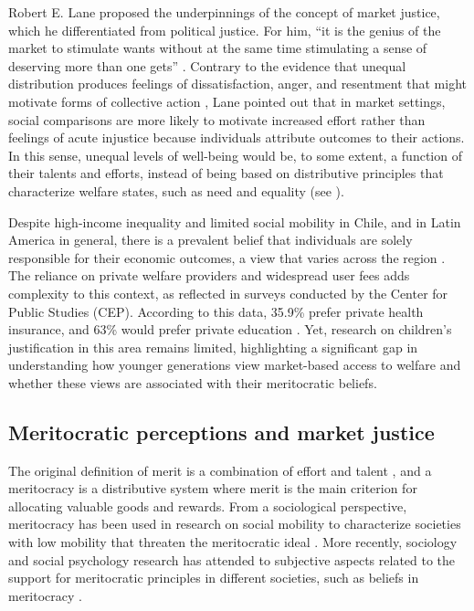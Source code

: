 \documentclass[
    behavsci,
    article,
    submit,
moreauthors
]{mdpi}
\begin{document}
Robert E. Lane proposed the underpinnings of the concept of market
justice, which he differentiated from political justice. For him, ``it
is the genius of the market to stimulate wants without at the same time
stimulating a sense of deserving more than one gets''
\citeyearpar[p.~384]{lane_market_1986}. Contrary to the evidence that
unequal distribution produces feelings of dissatisfaction, anger, and
resentment that might motivate forms of collective action
\citep{greitemeyer_subjective_2016, mishra_subjective_2015, smith_relative_2012, power_deprivationprotest_2018},
Lane pointed out that in market settings, social comparisons are more
likely to motivate increased effort rather than feelings of acute
injustice because individuals attribute outcomes to their actions. In
this sense, unequal levels of well-being would be, to some extent, a
function of their talents and efforts, instead of being based on
distributive principles that characterize welfare states, such as need
and equality (see \citep{wilson_role_2003}).

Despite high-income inequality and limited social mobility in Chile, and
in Latin America in general, there is a prevalent belief that
individuals are solely responsible for their economic outcomes, a view
that varies across the region
\citep{bucca_merit_2016, chong_mystery_2008, torche_intergenerational_2014, salgado_inequality_2023}.
The reliance on private welfare providers and widespread user fees
\citep{molyneux_neoliberal_2008} adds complexity to this context, as
reflected in surveys conducted by the Center for Public Studies (CEP).
According to this data, 35.9\% prefer private health insurance, and 63\%
would prefer private education
\citep{centrodeestudiospublicos_estudio_2024}. Yet, research on
children's justification in this area remains limited, highlighting a
significant gap in understanding how younger generations view
market-based access to welfare and whether these views are associated
with their meritocratic beliefs.

\subsection{Meritocratic perceptions and market
justice}\label{meritocratic-perceptions-and-market-justice}

The original definition of merit is a combination of effort and talent
\citep{young_rise_1958}, and a meritocracy is a distributive system
where merit is the main criterion for allocating valuable goods and
rewards. From a sociological perspective, meritocracy has been used in
research on social mobility to characterize societies with low mobility
that threaten the meritocratic ideal \citep{goldthorpe_myth_2003}. More
recently, sociology and social psychology research has attended to
subjective aspects related to the support for meritocratic principles in
different societies, such as beliefs in meritocracy
\citep{castillo_multidimensional_2023, mijs_unfulfillable_2016, mijs_paradox_2019}.
\end{document}
